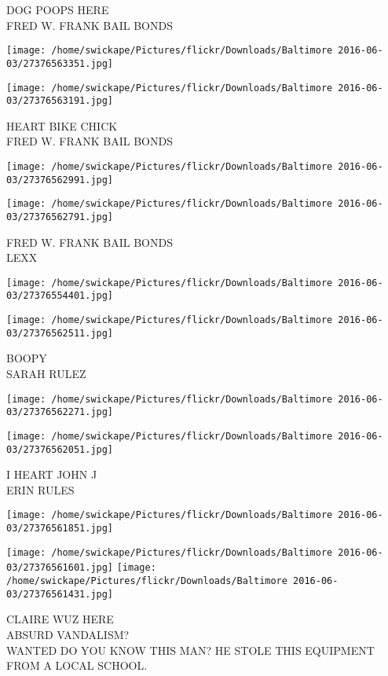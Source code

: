 \documentclass[10pt,letterpaper]{article}
\begin{document}
DOG POOPS HERE\\
FRED W. FRANK BAIL BONDS
\pagebreak

\texttt{[image: /home/swickape/Pictures/flickr/Downloads/Baltimore 2016-06-03/27376563351.jpg]}

\vspace{0.25in}
\texttt{[image: /home/swickape/Pictures/flickr/Downloads/Baltimore 2016-06-03/27376563191.jpg]}

HEART BIKE CHICK\\
FRED W. FRANK BAIL BONDS
\pagebreak

\texttt{[image: /home/swickape/Pictures/flickr/Downloads/Baltimore 2016-06-03/27376562991.jpg]}

\vspace{0.25in}
\texttt{[image: /home/swickape/Pictures/flickr/Downloads/Baltimore 2016-06-03/27376562791.jpg]}

FRED W. FRANK BAIL BONDS\\
LEXX
\pagebreak

\texttt{[image: /home/swickape/Pictures/flickr/Downloads/Baltimore 2016-06-03/27376554401.jpg]}

\vspace{0.25in}
\texttt{[image: /home/swickape/Pictures/flickr/Downloads/Baltimore 2016-06-03/27376562511.jpg]}

BOOPY\\
SARAH RULEZ
\pagebreak

\texttt{[image: /home/swickape/Pictures/flickr/Downloads/Baltimore 2016-06-03/27376562271.jpg]}

\vspace{0.25in}
\texttt{[image: /home/swickape/Pictures/flickr/Downloads/Baltimore 2016-06-03/27376562051.jpg]}

I HEART JOHN J\\
ERIN RULES
\pagebreak

\texttt{[image: /home/swickape/Pictures/flickr/Downloads/Baltimore 2016-06-03/27376561851.jpg]}

\vspace{0.25in}
\texttt{[image: /home/swickape/Pictures/flickr/Downloads/Baltimore 2016-06-03/27376561601.jpg]}
\texttt{[image: /home/swickape/Pictures/flickr/Downloads/Baltimore 2016-06-03/27376561431.jpg]}

CLAIRE WUZ HERE\\
ABSURD VANDALISM?\\
WANTED DO YOU KNOW THIS MAN?  HE STOLE THIS EQUIPMENT FROM A LOCAL SCHOOL.
\pagebreak
\end{document}
